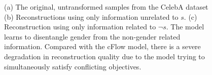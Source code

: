 \begin{figure}[tb]
{    (a) The original, untransformed samples from the CelebA dataset
    (b) Reconstructions using only information unrelated to $s$.
    (c) Reconstruction using only information related to $\neg s$.
    The model learns to disentangle gender from the non-gender related information. Compared with the cFlow model, there is a severe degradation in reconstruction quality due to the model trying to simultaneously satisfy conflicting objectives.
  }\label{fig:celeba_vae}
\end{figure}

\begin{figure}[tb]
  \centering
\end{figure}
